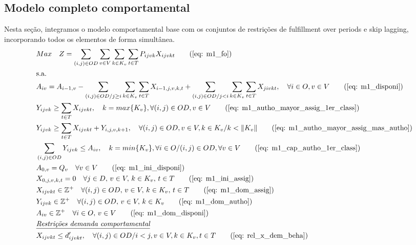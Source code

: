 \subsection{Modelo completo comportamental}
Nesta seção, integramos o modelo comportamental base com os conjuntos de restrições de fulfillment over periods e skip lagging, incorporando todos os elementos de forma simultânea.
\allowdisplaybreaks
\begin{align}
	& Max \quad Z = \sum_{(i,j)\in OD} \sum_{v\in V} \sum_{k\in K_v} \sum_{t\in T} P_{ijvk} X_{ijvkt}     \tag{\ref{eq: m1_fo}}   \\
	& \text{s.a.}  \notag \\
	& A_{iv} = A_{i-1,v} - \sum_{(i,j) \in OD/j \geq i} \sum_{k\in K_v}\sum_{t\in T}X_{i-1,j,v,k,t} + \sum_{(i,j) \in OD/j<i} \sum_{k\in K_v}\sum_{t\in T}X_{jivkt}, \quad \forall i \in O, v \in V   \tag{\ref{eq: m1_disponi}} \\
	& Y_{ijvk} \geq  \sum_{t \in T} X_{ijvkt},  \quad k = max\{K_v\}, \forall(i,j) \in OD ,v \in V     \tag{\ref{eq: m1_autho_mayor_assig_1er_class}} \\
	& Y_{ijvk} \geq  \sum_{t \in T} X_{ijvkt} + Y_{i,j,v,k + 1} , \quad \forall(i,j) \in OD, v \in V, k \in K_v / k < \lVert K_v \rVert   \tag{\ref{eq: m1_autho_mayor_assig_mas_autho}} \\
	& \sum_{(i,j) \in OD} Y_{ijvk} \leq A_{iv}, \quad  k = min\{K_v\}, \forall i \in O / (i,j) \in OD,   \forall v \in V       \tag{\ref{eq: m1_cap_autho_1er_class}} \\
	& A_{0,v} = Q_v \quad \forall v \in V  \tag{\ref{eq: m1_ini_disponi}} \\ 
	& X_{0,j,v,k,t} = 0 \quad \forall j \in D,\, v \in V,\, k \in K_v,\, t \in T  \tag{\ref{eq: m1_ini_assig}} \\ 
	& X_{ijvkt} \in \mathbb{Z}^+ \quad \forall(i,j) \in OD,\, v \in V,\, k \in K_v,\, t \in T  \tag{\ref{eq: m1_dom_assig}} \\ 
	& Y_{ijvk} \in \mathbb{Z}^+ \quad \forall(i,j) \in OD,\, v \in V,\, k \in K_v  \tag{\ref{eq: m1_dom_autho}} \\ 
	& A_{iv} \in \mathbb{Z}^+ \quad \forall i \in O,\, v \in V  \tag{\ref{eq: m1_dom_disponi}} \\
	& \textit{\underline{Restrições demanda comportamental}}         \notag   \\
	& X_{ijvkt} \leq d'_{ijvkt},  \quad \forall (i,j) \in OD / i < j  ,v \in V, k \in K_v, t\in T   \tag{\ref{eq: rel_x_dem_beha}} \\

\end{align}
